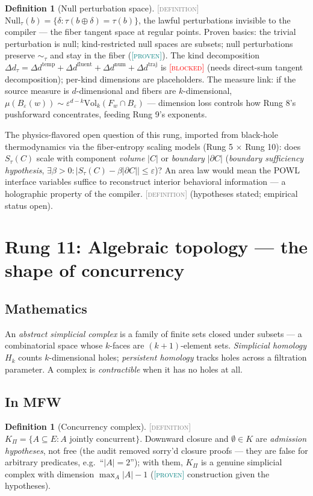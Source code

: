 \documentclass[11pt]{article}
\newcommand{\PROVEN}{\textcolor{teal}{\textsc{[proven]}}}
\newcommand{\DEFINITION}{\textcolor{gray}{\textsc{[definition]}}}
\newcommand{\BLOCKED}{\textcolor{red}{\textsc{[blocked]}}}
\newcommand{\PT}{\Pi}
\newcommand{\fib}[1]{F_{#1}}
\theoremstyle{plain}
\theoremstyle{definition}
\newtheorem{definition}[theorem]{Definition}
\theoremstyle{remark}
\begin{document}
\begin{definition}[Null perturbation space]\DEFINITION\;
$\mathrm{Null}_\tau(b) = \{\delta : \tau(b \oplus \delta) = \tau(b)\}$,
the lawful perturbations invisible to the compiler --- the fiber tangent
space at regular points. Proven basics: the trivial perturbation is null;
kind-restricted null spaces are subsets; null perturbations preserve
$\sim_\tau$ and stay in the fiber (\PROVEN). The kind decomposition
$\Delta d_\tau = \Delta d^{\mathrm{temp}} + \Delta d^{\mathrm{fluent}}
+ \Delta d^{\mathrm{num}} + \Delta d^{\mathrm{traj}}$ is \BLOCKED{}
(needs direct-sum tangent decomposition); per-kind dimensions are
placeholders. The measure link: if the source measure is $d$-dimensional
and fibers are $k$-dimensional,
$\mu(B_\varepsilon(w)) \sim \varepsilon^{d-k}
\mathrm{Vol}_k(\fib{w} \cap B_\varepsilon)$ --- dimension loss controls how
Rung 8's pushforward concentrates, feeding Rung 9's exponents.
\end{definition}

The physics-flavored open question of this rung, imported from
black-hole thermodynamics via the fiber-entropy scaling models
(Rung 5 $\times$ Rung 10): does $S_\tau(C)$ scale with component
\emph{volume} $|C|$ or \emph{boundary} $|\partial C|$
(\emph{boundary sufficiency hypothesis},
$\exists \beta > 0: |S_\tau(C) - \beta|\partial C|| \le \varepsilon$)?
An area law would mean the POWL interface variables suffice to reconstruct
interior behavioral information --- a holographic property of the compiler.
\DEFINITION{} (hypotheses stated; empirical status open).

\section{Rung 11: Algebraic topology --- the shape of concurrency}
\label{sec:rung11}

\subsection{Mathematics}
An \emph{abstract simplicial complex} is a family of finite sets closed
under subsets --- a combinatorial space whose $k$-faces are $(k{+}1)$-element
sets. \emph{Simplicial homology} $H_k$ counts $k$-dimensional holes;
\emph{persistent homology} tracks holes across a filtration parameter.
A complex is \emph{contractible} when it has no holes at all.

\subsection{In MFW}
\begin{definition}[Concurrency complex]\DEFINITION\;
$K_\PT = \{A \subseteq E : A \text{ jointly concurrent}\}$. Downward
closure and $\emptyset \in K$ are \emph{admission hypotheses}, not free
(the audit removed sorry'd closure proofs --- they are false for arbitrary
predicates, e.g.\ ``$|A| = 2$''); with them, $K_\PT$ is a genuine
simplicial complex with dimension $\max_{A} |A| - 1$ (\PROVEN{}
construction given the hypotheses).
\end{definition}
\end{document}
